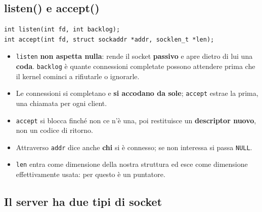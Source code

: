 \subsection{listen() e accept()}

\begin{lstlisting}[language={[POSIX]C}]
int listen(int fd, int backlog);
int accept(int fd, struct sockaddr *addr, socklen_t *len);
\end{lstlisting}

\begin{itemize}
    \item \texttt{listen} \textbf{non aspetta nulla}: rende il socket \textbf{passivo} e apre dietro di lui una
          \textbf{coda}. \texttt{backlog} è quante connessioni completate possono attendere prima che il kernel cominci a
          rifiutarle o ignorarle.
    \item Le connessioni si completano e \textbf{si accodano da sole}; \texttt{accept} estrae la prima, una chiamata per
          ogni client.
    \item \texttt{accept} si blocca finché non ce n'è una, poi restituisce un \textbf{descriptor nuovo}, non un codice di
          ritorno.
    \item Attraverso \texttt{addr} dice anche \textbf{chi} si è connesso; se non interessa si passa \texttt{NULL}.
    \item \texttt{len} entra come dimensione della nostra struttura ed esce come dimensione effettivamente usata: per
          questo è un puntatore.
\end{itemize}

\subsection{Il server ha due tipi di socket}

